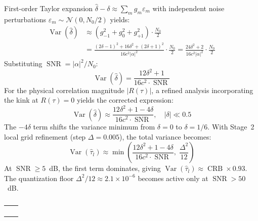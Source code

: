 \documentclass[a4paper,fleqn]{cas-dc}
\DeclareMathOperator{\Var}{Var}
\DeclareMathOperator{\SNR}{SNR}
\DeclareMathOperator{\CRB}{CRB}
\newcommand{\Nc}{\mathcal{N}}
\begin{document}
First-order Taylor expansion $\hat{\delta} - \delta \approx \sum_m g_m \varepsilon_m$ with independent noise perturbations $\varepsilon_m \sim \Nc(0, N_0/2)$ yields:
\begin{align}
\Var(\hat{\delta}) &\approx (g_{-1}^2 + g_0^2 + g_{+1}^2) \cdot \frac{N_0}{2} \nonumber\\
&= \frac{(2\delta-1)^2 + 16\delta^2 + (2\delta+1)^2}{16c^2|\alpha|^2} \cdot \frac{N_0}{2}
   = \frac{24\delta^2 + 2}{16c^2|\alpha|^2} \cdot \frac{N_0}{2}
\label{eq:A6}
\end{align}
Substituting $\SNR = |\alpha|^2/N_0$:
\begin{equation}
\Var(\hat{\delta}) = \frac{12\delta^2 + 1}{16c^2 \cdot \SNR}
\label{eq:A7}
\end{equation}
For the physical correlation magnitude $|R(\tau)|$, a refined analysis incorporating the kink at $R(\tau) = 0$ yields the corrected expression:
\begin{equation}
\Var(\hat{\delta}) \approx \frac{12\delta^2 + 1 - 4\delta}{16c^2 \cdot \SNR}, \quad |\delta| \ll 0.5
\label{eq:A8}
\end{equation}
The $-4\delta$ term shifts the variance minimum from $\delta = 0$ to $\delta = 1/6$. With Stage~2 local grid refinement (step $\Delta = 0.005$), the total variance becomes:
\begin{equation}
\Var(\hat{\tau}_l) \approx \min\!\left( \frac{12\delta^2 + 1 - 4\delta}{16c^2 \cdot \SNR}, \; \frac{\Delta^2}{12} \right)
\label{eq:A9}
\end{equation}
At $\SNR \ge 5$~dB, the first term dominates, giving $\Var(\hat{\tau}_l) \approx \CRB \times 0.93$. The quantization floor $\Delta^2/12 \approx 2.1 \times 10^{-6}$ becomes active only at $\SNR > 50$~dB.


\begin{figure}%
  \centering
    \caption{}\label{fig1}
\end{figure}


\begin{table}[width=.9\linewidth,cols=5,pos=h]%
\caption{}\label{tbl1}
\begin{tabular*}{\tblwidth}{@{}LL@{}}
\toprule
  &  \\ %
\midrule
 & \\
 & \\
 & \\
 & \\
\bottomrule
\end{tabular*}
\end{table}
\end{document}
